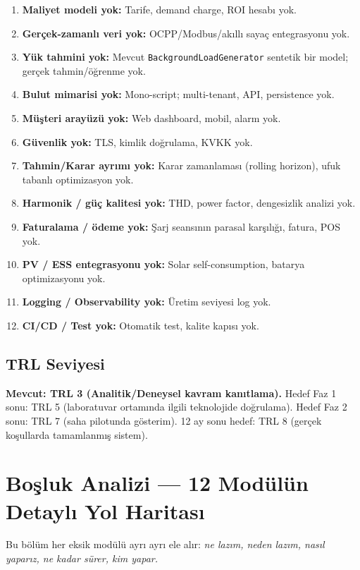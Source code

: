 \documentclass[11pt,a4paper]{article}
\begin{document}
\begin{enumerate}
    \item \textbf{Maliyet modeli yok:} Tarife, demand charge, ROI hesabı yok.
    \item \textbf{Gerçek-zamanlı veri yok:} OCPP/Modbus/akıllı sayaç entegrasyonu yok.
    \item \textbf{Yük tahmini yok:} Mevcut \texttt{BackgroundLoadGenerator} sentetik bir model; gerçek tahmin/öğrenme yok.
    \item \textbf{Bulut mimarisi yok:} Mono-script; multi-tenant, API, persistence yok.
    \item \textbf{Müşteri arayüzü yok:} Web dashboard, mobil, alarm yok.
    \item \textbf{Güvenlik yok:} TLS, kimlik doğrulama, KVKK yok.
    \item \textbf{Tahmin/Karar ayrımı yok:} Karar zamanlaması (rolling horizon), ufuk tabanlı optimizasyon yok.
    \item \textbf{Harmonik / güç kalitesi yok:} THD, power factor, dengesizlik analizi yok.
    \item \textbf{Faturalama / ödeme yok:} Şarj seansının parasal karşılığı, fatura, POS yok.
    \item \textbf{PV / ESS entegrasyonu yok:} Solar self-consumption, batarya optimizasyonu yok.
    \item \textbf{Logging / Observability yok:} Üretim seviyesi log yok.
    \item \textbf{CI/CD / Test yok:} Otomatik test, kalite kapısı yok.
\end{enumerate}

\subsection{TRL Seviyesi}

\textbf{Mevcut: TRL 3 (Analitik/Deneysel kavram kanıtlama).} Hedef Faz 1 sonu: TRL 5 (laboratuvar ortamında ilgili teknolojide doğrulama). Hedef Faz 2 sonu: TRL 7 (saha pilotunda gösterim). 12 ay sonu hedef: TRL 8 (gerçek koşullarda tamamlanmış sistem).

\section{Boşluk Analizi — 12 Modülün Detaylı Yol Haritası}

Bu bölüm her eksik modülü ayrı ayrı ele alır: \textit{ne lazım, neden lazım, nasıl yaparız, ne kadar sürer, kim yapar.}
\end{document}
